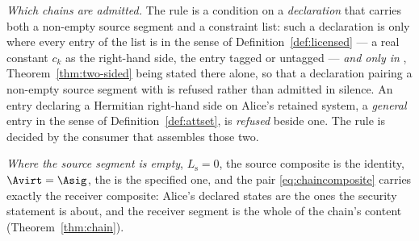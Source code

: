 \begin{definition}
\emph{Which chains are admitted.} The rule is a condition on a
\emph{declaration} that carries both a non-empty source segment and a
constraint list: such a declaration is
only where every entry of the list is  in the sense of
Definition~\ref{def:licensed} --- a real constant $c_k$ as the right-hand
side, the entry tagged or untagged --- \emph{and only in
}, Theorem~\ref{thm:two-sided} being stated there
alone, so that a declaration pairing a non-empty source segment with
 is refused rather than admitted in silence. An
entry declaring a Hermitian right-hand side on Alice's retained system, a
\emph{general} entry in the sense of Definition~\ref{def:attset}, is
\emph{refused} beside one. The rule
is decided by the consumer that assembles those two.

\emph{Where the source segment is empty}, $L_{\mathrm s}=0$, the source
composite is the identity, $\Avirt=\Asig$, the  is the
specified one, and the pair \eqref{eq:chaincomposite} carries exactly the
receiver composite: Alice's declared states are the ones the security
statement is about, and the receiver segment is the whole of the chain's
content (Theorem~\ref{thm:chain}).
\end{definition}
